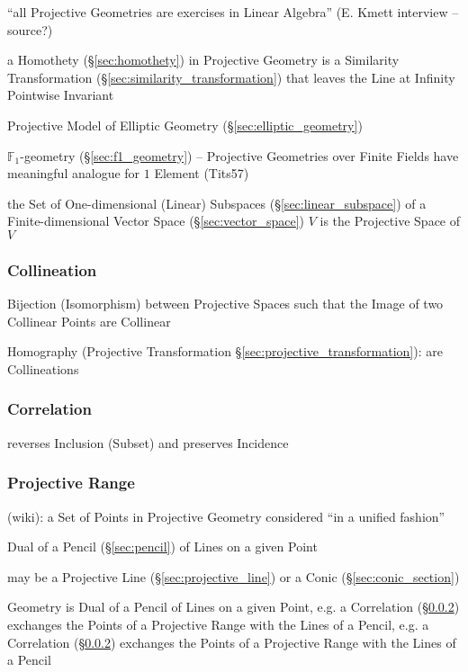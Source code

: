 ``all Projective Geometries are exercises in Linear Algebra'' (E.
Kmett interview -- source?) %

a Homothety (\S\ref{sec:homothety}) in Projective Geometry is a Similarity
Transformation (\S\ref{sec:similarity_transformation}) that leaves the Line at
Infinity Pointwise Invariant

Projective Model of Elliptic Geometry (\S\ref{sec:elliptic_geometry})

\fist $\mathbb{F}_1$-geometry (\S\ref{sec:f1_geometry}) -- Projective Geometries
over Finite Fields have meaningful analogue for $1$ Element (Tits57)

\fist the Set of One-dimensional (Linear) Subspaces
(\S\ref{sec:linear_subspace}) of a Finite-dimensional Vector Space
(\S\ref{sec:vector_space}) $V$ is the Projective Space of $V$



\subsubsection{Collineation}\label{sec:collineation}

Bijection (Isomorphism) between Projective Spaces such that the Image of two
Collinear Points are Collinear

\fist Homography (Projective Transformation
\S\ref{sec:projective_transformation}): are Collineations %



\subsubsection{Correlation}\label{sec:correlation}

reverses Inclusion (Subset) and preserves Incidence



\subsubsection{Projective Range}\label{sec:projective_range}

(wiki): a Set of Points in Projective Geometry considered ``in a unified
fashion''

Dual of a Pencil (\S\ref{sec:pencil}) of Lines on a given Point

may be a Projective Line (\S\ref{sec:projective_line}) or a Conic
(\S\ref{sec:conic_section})

Geometry is Dual of a Pencil of Lines on a given Point, e.g. a Correlation
(\S\ref{sec:correlation}) exchanges the Points of a Projective Range with the
Lines of a Pencil, e.g. a Correlation (\S\ref{sec:correlation}) exchanges the
Points of a Projective Range with the Lines of a Pencil

